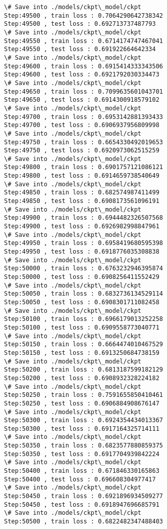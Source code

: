 \documentclass[11pt]{article}
\begin{document}
\begin{Verbatim}[commandchars=\\\{\}]
\# Save into ./models/ckpt\_model/ckpt
Step:49500 , train loss : 0.7064290642738342
Step:49500 , test loss : 0.692713737487793
\# Save into ./models/ckpt\_model/ckpt
Step:49550 , train loss : 0.6714174747467041
Step:49550 , test loss : 0.691922664642334
\# Save into ./models/ckpt\_model/ckpt
Step:49600 , train loss : 0.6915414333343506
Step:49600 , test loss : 0.6921792030334473
\# Save into ./models/ckpt\_model/ckpt
Step:49650 , train loss : 0.7099635601043701
Step:49650 , test loss : 0.6914300918579102
\# Save into ./models/ckpt\_model/ckpt
Step:49700 , train loss : 0.6953142881393433
Step:49700 , test loss : 0.6906937956809998
\# Save into ./models/ckpt\_model/ckpt
Step:49750 , train loss : 0.6654330492019653
Step:49750 , test loss : 0.6920973062515259
\# Save into ./models/ckpt\_model/ckpt
Step:49800 , train loss : 0.6901757121086121
Step:49800 , test loss : 0.6914659738540649
\# Save into ./models/ckpt\_model/ckpt
Step:49850 , train loss : 0.682574987411499
Step:49850 , test loss : 0.6908173561096191
\# Save into ./models/ckpt\_model/ckpt
Step:49900 , train loss : 0.6944482326507568
Step:49900 , test loss : 0.6926982998847961
\# Save into ./models/ckpt\_model/ckpt
Step:49950 , train loss : 0.6958419680595398
Step:49950 , test loss : 0.6918776035308838
\# Save into ./models/ckpt\_model/ckpt
Step:50000 , train loss : 0.6763232946395874
Step:50000 , test loss : 0.6908256411552429
\# Save into ./models/ckpt\_model/ckpt
Step:50050 , train loss : 0.6832736134529114
Step:50050 , test loss : 0.6908301711082458
\# Save into ./models/ckpt\_model/ckpt
Step:50100 , train loss : 0.6966179013252258
Step:50100 , test loss : 0.6909558773040771
\# Save into ./models/ckpt\_model/ckpt
Step:50150 , train loss : 0.6664474010467529
Step:50150 , test loss : 0.6913250684738159
\# Save into ./models/ckpt\_model/ckpt
Step:50200 , train loss : 0.6813187599182129
Step:50200 , test loss : 0.6908932328224182
\# Save into ./models/ckpt\_model/ckpt
Step:50250 , train loss : 0.7591655850410461
Step:50250 , test loss : 0.6906884908676147
\# Save into ./models/ckpt\_model/ckpt
Step:50300 , train loss : 0.6924354434013367
Step:50300 , test loss : 0.6917164325714111
\# Save into ./models/ckpt\_model/ckpt
Step:50350 , train loss : 0.6823577880859375
Step:50350 , test loss : 0.6917704939842224
\# Save into ./models/ckpt\_model/ckpt
Step:50400 , train loss : 0.671846330165863
Step:50400 , test loss : 0.696608304977417
\# Save into ./models/ckpt\_model/ckpt
Step:50450 , train loss : 0.6921896934509277
Step:50450 , test loss : 0.6918947696685791
\# Save into ./models/ckpt\_model/ckpt
Step:50500 , train loss : 0.6822482347488403

\end{Verbatim}
\end{document}
